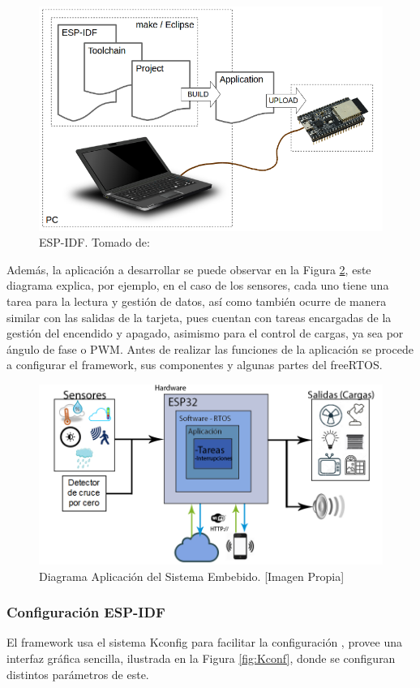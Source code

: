 \begin{figure}[H]
	\centering
	\caption[ESP-IDF.]{ESP-IDF. Tomado de: \cite{ES}}
	\label{fig:what-you-need}
	\includegraphics[width=0.5\linewidth]{Imagenes/what-you-need}
\end{figure}

Además, la aplicación a desarrollar se puede observar en la Figura \ref{fig:App}, este diagrama explica, por ejemplo, en el caso de los sensores, cada uno tiene una tarea para la lectura y gestión de datos, así como también ocurre de manera similar con las salidas de la tarjeta, pues cuentan con tareas encargadas de la gestión del encendido y apagado, asimismo para el control de cargas, ya sea por ángulo de fase o PWM. Antes de realizar las funciones de la aplicación se procede a configurar el framework, sus componentes y algunas partes del freeRTOS.\\

\begin{figure}[H]
	\centering
	\caption[Diagrama Aplicación del Sistema Embebido.]{Diagrama Aplicación del Sistema Embebido. [Imagen Propia]}
	\label{fig:App}
	\includegraphics[width=0.7\linewidth]{Imagenes/B_Aplicacion}
\end{figure}

\subsubsection{Configuración ESP-IDF}

El framework usa el sistema Kconfig para facilitar la configuración \cite{ES}, provee una interfaz gráfica sencilla, ilustrada en la Figura \ref{fig:Kconf}, donde se configuran distintos parámetros de este.

